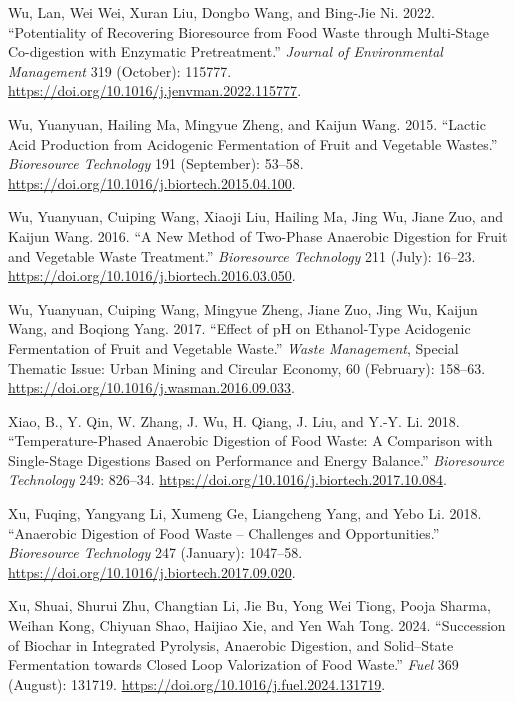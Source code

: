 \documentclass[11pt]{report}
\begin{document}
\begin{hangparas}{1.5em}{1}
\hypertarget{citeproc_bib_item_76}{Wu, Lan, Wei Wei, Xuran Liu, Dongbo Wang, and Bing-Jie Ni. 2022. “Potentiality of Recovering Bioresource from Food Waste through Multi-Stage Co-digestion with Enzymatic Pretreatment.” \textit{Journal of Environmental Management} 319 (October): 115777. \url{https://doi.org/10.1016/j.jenvman.2022.115777}.}

\hypertarget{citeproc_bib_item_77}{Wu, Yuanyuan, Hailing Ma, Mingyue Zheng, and Kaijun Wang. 2015. “Lactic Acid Production from Acidogenic Fermentation of Fruit and Vegetable Wastes.” \textit{Bioresource Technology} 191 (September): 53–58. \url{https://doi.org/10.1016/j.biortech.2015.04.100}.}

\hypertarget{citeproc_bib_item_78}{Wu, Yuanyuan, Cuiping Wang, Xiaoji Liu, Hailing Ma, Jing Wu, Jiane Zuo, and Kaijun Wang. 2016. “A New Method of Two-Phase Anaerobic Digestion for Fruit and Vegetable Waste Treatment.” \textit{Bioresource Technology} 211 (July): 16–23. \url{https://doi.org/10.1016/j.biortech.2016.03.050}.}

\hypertarget{citeproc_bib_item_79}{Wu, Yuanyuan, Cuiping Wang, Mingyue Zheng, Jiane Zuo, Jing Wu, Kaijun Wang, and Boqiong Yang. 2017. “Effect of pH on Ethanol-Type Acidogenic Fermentation of Fruit and Vegetable Waste.” \textit{Waste Management}, Special Thematic Issue: Urban Mining and Circular Economy, 60 (February): 158–63. \url{https://doi.org/10.1016/j.wasman.2016.09.033}.}

\hypertarget{citeproc_bib_item_80}{Xiao, B., Y. Qin, W. Zhang, J. Wu, H. Qiang, J. Liu, and Y.-Y. Li. 2018. “Temperature-Phased Anaerobic Digestion of Food Waste: A Comparison with Single-Stage Digestions Based on Performance and Energy Balance.” \textit{Bioresource Technology} 249: 826–34. \url{https://doi.org/10.1016/j.biortech.2017.10.084}.}

\hypertarget{citeproc_bib_item_81}{Xu, Fuqing, Yangyang Li, Xumeng Ge, Liangcheng Yang, and Yebo Li. 2018. “Anaerobic Digestion of Food Waste – Challenges and Opportunities.” \textit{Bioresource Technology} 247 (January): 1047–58. \url{https://doi.org/10.1016/j.biortech.2017.09.020}.}

\hypertarget{citeproc_bib_item_82}{Xu, Shuai, Shurui Zhu, Changtian Li, Jie Bu, Yong Wei Tiong, Pooja Sharma, Weihan Kong, Chiyuan Shao, Haijiao Xie, and Yen Wah Tong. 2024. “Succession of Biochar in Integrated Pyrolysis, Anaerobic Digestion, and Solid–State Fermentation towards Closed Loop Valorization of Food Waste.” \textit{Fuel} 369 (August): 131719. \url{https://doi.org/10.1016/j.fuel.2024.131719}.}


\end{hangparas}
\end{document}
